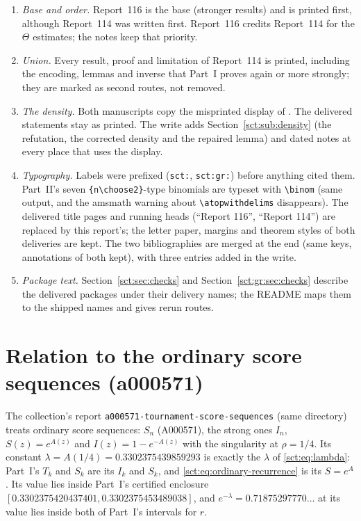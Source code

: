 \documentclass[11pt,letterpaper]{article}
\newcommand{\file}[1]{\nolinkurl{#1}}
\theoremstyle{definition}\newtheorem{remark}[theorem]{Remark}
\begin{document}
\begin{enumerate}
\item \emph{Base and order.} Report~116 is the base (stronger results) and is printed first, although Report~114 was written first. Report~116 credits Report~114 for the $\Theta$ estimates; the notes keep that priority.
\item \emph{Union.} Every result, proof and limitation of Report~114 is printed, including the encoding, lemmas and inverse that Part~I proves again or more strongly; they are marked as second routes, not removed.
\item \emph{The density.} Both manuscripts copy the misprinted display of \cite{dw}. The delivered statements stay as printed. The write adds Section~\ref{sct:sub:density} (the refutation, the corrected density and the repaired lemma) and dated notes at every place that uses the display.
\item \emph{Typography.} Labels were prefixed (\texttt{sct:}, \texttt{sct:gr:}) before anything cited them. Part~II's seven \verb|{n\choose2}|-type binomials are typeset with \verb|\binom| (same output, and the amsmath warning about \verb|\atopwithdelims| disappears). The delivered title pages and running heads (``Report 116'', ``Report 114'') are replaced by this report's; the letter paper, margins and theorem styles of both deliveries are kept. The two bibliographies are merged at the end (same keys, annotations of both kept), with three entries added in the write.
\item \emph{Package text.} Section~\ref{sct:sec:checks} and Section~\ref{sct:gr:sec:checks} describe the delivered packages under their delivery names; the README maps them to the shipped names and gives rerun routes.
\end{enumerate}

\section*{Relation to the ordinary score sequences (a000571)}\label{sct:sec:neighbours}
The collection's report \file{a000571-tournament-score-sequences} (same directory) treats ordinary score sequences: $S_n$ (A000571), the strong ones $I_n$, $S(z)=e^{A(z)}$ and $I(z)=1-e^{-A(z)}$ with the singularity at $\rho=1/4$. Its constant $\lambda=A(1/4)=0.3302375439859293$ is exactly the $\lambda$ of \eqref{sct:eq:lambda}: Part~I's $T_k$ and $S_k$ are its $I_k$ and $S_k$, and \eqref{sct:eq:ordinary-recurrence} is its $S=e^A$. Its value lies inside Part~I's certified enclosure $[0.3302375420437401,0.3302375453489038]$, and $e^{-\lambda}=0.71875297770\ldots$ at its value lies inside both of Part~I's intervals for $r$.
\end{document}
